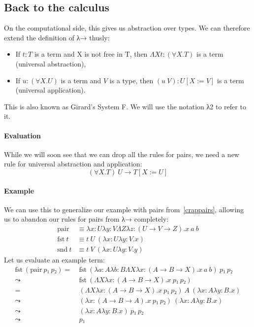\documentclass[12pt]{article}
\begin{document}
\subsection{Back to the calculus}
On the computational side, this gives us abstraction over types. We can therefore extend the definition of λ→ thusly:
\begin{itemize}
    \item If $t:T$ is a term and X is not free in T, then $ΛXt:(∀X.T)$ is a term (universal abstraction),
    \item If $u:(∀X.U)$ is a term and $V$ is a type, then $(u \ V):U[X:=V]$ is a term (universal application).
\end{itemize}
This is also known as Girard's System F. We will use the notation λ2 to refer to it.
\paragraph{Evaluation}
While we will soon see that we can drop all the rules for pairs, we need a new rule for universal abstraction and application:
\[(∀X.T) \ U → T[X:=U]\]
\paragraph{Example}
We can use this to generalize our example with pairs from~\ref{crappairs}, allowing us to abandon our rules for pairs from λ→ completely:
\begin{align*}
    \mathrm{pair} &≡ λx:Uλy:VΛZλz:(U → V → Z).x \ a \ b\\
    \mathrm{fst} \ t &≡ t \ U \ (λx:Uλy:V.x)\\
    \mathrm{snd} \ t &≡ t \ V \ (λx:Uλy:V.y)
\end{align*}
Let us evaluate an example term:
\begin{align*}
    \mathrm{fst} \ (\mathrm{pair} \ p₁ \ p₂) =& \ \mathrm{fst} \ (λa:Aλb:BΛXλx:(A → B → X).x \ a \ b) \ p₁ \ p₂\\
    \leadsto& \ \mathrm{fst} \ (ΛXλx:(A → B → X).x \ p₁ \ p₂)\\
    =& \ (ΛXλx:(A → B → X).x \ p₁ \ p₂) \ A \ (λx:Aλy:B.x)\\
    \leadsto& \ (λx:(A → B → A).x \ p₁ \ p₂) \ (λx:Aλy:B.x)\\
    \leadsto& \ (λx:Aλy:B.x) \ p₁ \ p₂\\
    \leadsto& \ p₁\\
\end{align*}
\end{document}
